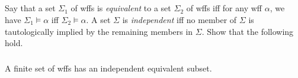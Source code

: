 \documentclass{report}
\begin{document}
\subsection{}%

  Say that a set $\Sigma_1$ of wffs is \textit{equivalent} to a set $\Sigma_2$
    of wffs iff for any wff $\alpha$, we have $\Sigma_1 \vDash \alpha$ iff
    $\Sigma_2 \vDash \alpha$.
  A set $\Sigma$ is \textit{independent} iff no member of $\Sigma$ is
    tautologically implied by the remaining members in $\Sigma$.
  Show that the following hold.

\subsubsection{}%

  A finite set of wffs has an independent equivalent subset.
\end{document}
